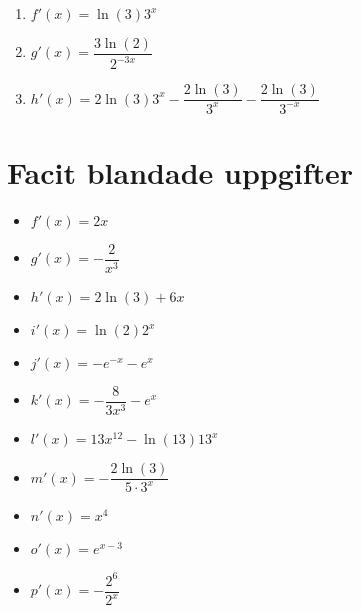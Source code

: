 \documentclass[a4paper, 12pt]{article}
\begin{document}
\begin{facit}
    \begin{multicols}{3}
        \begin{enumerate}
            \item $f'(x) = \ln (3) 3^x$
            \item $g'(x) = \dfrac{3\ln (2)}{2^{-3x}}$
            \item $h'(x) = 2 \ln (3) 3^x - \dfrac{2\ln (3)}{3^x} - \dfrac {2\ln (3)}{3^{-x}}$
        \end{enumerate}
    \end{multicols}
\end{facit}

\newpage
\section{Facit blandade uppgifter}

\begin{blufacit}
    \begin{itemize}
        \item $f'(x) = 2x$
        \item $g'(x) = -\dfrac{2}{x^3}$
        \item $h'(x) = 2 \ln(3) + 6x$
        \item $i'(x) = \ln(2) 2^x$
        \item $j'(x) = -e^{-x}- e^x$
        \item $k'(x) = -\dfrac{8}{3x^3}-e^x$
        \item $l'(x) = 13x^{12} - \ln(13)13^x$
        \item $m'(x) = -\dfrac{2\ln(3)}{5\cdot 3^x}$
        \item $n'(x) = x^4$
        \item $o'(x) = e^{x-3}$
        \item $p'(x) = - \dfrac{2^6}{2^x}$
    \end{itemize}
\end{blufacit}
\end{document}
